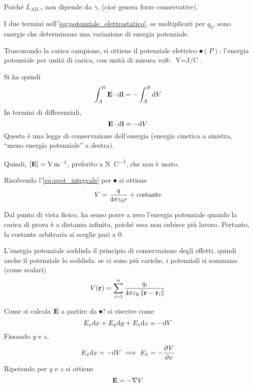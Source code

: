 Poiché $L_{AB,\gamma}$ non dipende da $\gamma$,  (cioè genera forze conservative).

I due termini nell'\cref{eq:potenziale_elettrostatico}, se moltiplicati per $q_0$, sono energie che determinano una variazione di energia potenziale.

Trascurando la carica campione, si ottiene il potenziale elettrico $\spot(P)$: l'energia potenziale per unità di carica, con unità di misura volt: $\unit{\volt} = \unit{\joule\per\coulomb}$.

Si ha quindi
\begin{equation}
\label{eq:spot_integrale}
    \int_A^B \mathbf{E} \cdot \mathrm{d} \mathbf{l} = -\int_A^B \mathrm{d} V
\end{equation}
In termini di differenziali,
\begin{equation}
\label{eq:spot_differenziali}
    \mathbf{E} \cdot \mathrm{d} \mathbf{l} = - \mathrm{d} V
\end{equation}
Questa è una legge di conservazione dell'energia (energia cinetica a sinistra, ``meno energia potenziale'' a destra).

Quindi, $[\E] = \unit{\volt\per\metre}$, preferito a \unit{\newton\per\coulomb}, che non è usato.

Risolvendo l'\cref{eq:spot_integrale} per $\spot$ si ottiene
\begin{equation}
    V = \frac{q}{4\pi \varepsilon_0 r} + \text{costante}
\end{equation}

Dal punto di vista ficico, ha senso porre a zero l'energia potenziale quando la carica di prova è a distanza infinita, poiché essa non subisce più lavoro.
Pertanto, la costante arbitraria si sceglie pari a $0$.

L'energia potenziale soddisfa il principio di conservazione degli effetti, quindi anche il potenziale lo soddisfa: se ci sono più cariche, i potenziali si sommano (come scalari)
\begin{equation}
    V(\mathbf{r}) = \sum_{i=1}^n \frac{q_i}{4\pi \varepsilon_0 \left\lVert \mathbf{r} - \mathbf{r}_i \right\rVert}
\end{equation}

Come si calcola $\mathbf{E}$ a partire da $\spot$?
 si riscrive come
\begin{equation}
    E_x \mathrm{d} x + E_y \mathrm{d} y + E_z \mathrm{d} z = - \mathrm{d} V
\end{equation}
Fissando $y$ e $z$,
\begin{equation}
    E_x \de x = - \de \spot \implies E_x = - \parder[\spot]{x}
\end{equation}
Ripetendo per $y$ e $z$ si ottiene
\begin{equation}
\label{eq:meno_grad_spot}
    \mathbf{E} = - \nabla V
\end{equation}

